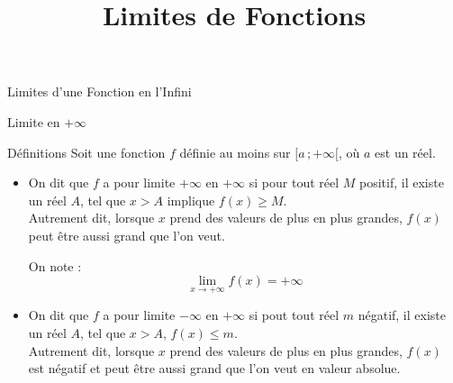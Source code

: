 \documentclass{cours}
\title{Limites de Fonctions}
\begin{document}

    \begin{Gpartie}{Limites d'une Fonction en l'Infini} 
        \begin{Spartie}{Limite en $+\infty$} 
            \begin{SSpartie}{Définitions} 
                Soit une fonction $f$ définie au moins sur $\big[a\,;+\infty\big[$, où $a$ est un réel.

                \begin{itemize}
                    \item   On dit que $f$ a pour limite $+\infty$ en $+\infty$ si pour tout réel $M$ positif, il existe un réel $A$, tel que $x>A$ implique $f(x)\geq M$. \\ Autrement dit, lorsque $x$ prend des valeurs de plus en plus grandes, $f(x)$ peut être aussi grand que l'on veut.
                    
                    On note : \[\boxed{\lim\limits_{x\to +\infty}f(x)=+\infty}\] 
                    \begin{center}
                        \parbox{\linewidth}{}
                    \end{center}
                    \pagebreak
                    \vspace{2ex}
                    \item   On dit que $f$ a pour limite $-\infty$ en $+\infty$ si pout tout réel $m$ négatif, il existe un réel $A$, tel que $x>A$, $f(x)\leq m$. \\ Autrement dit, lorsque $x$ prend des valeurs de plus en plus grandes, $f(x)$ est négatif et peut être aussi grand que l'on veut en valeur absolue.
                    

\end{itemize}
\end{SSpartie}
\end{Spartie}
\end{Gpartie}
\end{document}
